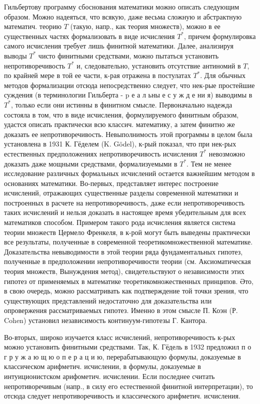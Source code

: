 \documentclass[10pt]{article}
\begin{document}
Гильбертову программу сбоснования математики можно описать следующим образом. Можно надеяться, что всякую, даже весьма сложную и абстрактную математич. теорию $T$ (такую, напр., как теория множеств), можно в ее существенных частях формализовать в виде исчисления $T^{*}$, причем формулировка самого исчисления требует лишь финитной математики. Далее, анализируя выводы $T^{*}$ чисто финитными средствами, можно пытаться установить непротиворечивость $T^{*}$ и, следовательно, установить отсутствие антиномий в $T$, по крайней мере в той ее части, к-рая отражена в постулатах $T^{*}$. Для обычных методов формализации отсюда непосредственно следует, что нек-рые простейшие суждения (в терминологии Гильберта - p е а л ьны е с у ж д е ни я) выводимы в $T^{*}$, только если они истинны в финитном смысле. Первоначально надежда состояла в том, что в виде исчисления, формулируемого финитным образом, удастся описать практически всю классич. математику, а затем финитно же доказать ее непротиворечивость. Невыполнимость этой программы в целом была установлена в 1931 К. Гёделем (K. Gödel), к-рый показал, что при нек-рых естественных предположениях непротиворечивость исчисления $T^{*}$ невозможно доказать даже мощными средствами, формализуемыми в $T^{*}$. Тем не менее исследование различных формальных исчислений остается важнейшим методом в основаниях математики. Во-первых, представляет интерес построение исчислений, отражающих существенные разделы современной математики и построенных в расчете на непротиворечивость, даже если непротиворечивость таких исчислений и нельзя доказать в настоящее время убедительным для всех математиков способом. Примером такого рода исчисления является система теории множеств Цермело Френкеля, в к-рой могут быть выведены практически все результаты, полученные в современной теоретикомножественной математике. Доказательства невыводимости в этой теории ряда фундаментальных гипотез, полученные в предположении непротиворечивости теории (см. Аксиоматическая теория множеств, Вынуждения метод), свидетельствуют о независимости этих гипотез от применяемых в математике теоретикомножественных принципов. Әто, в свою очередь, можно рассматривать как подтверждение той точки зрения, что существующих представлений недостаточно для доказательства или опровержения рассматриваемых гипотез. Именно в этом смысле П. Коэн (Р. Cohen) установил независимость континуум-гипотезы Г. Кантора.



Во-вторых, широко изучается класс исчислений, непротиворечивость к-рых можно установить финитными средствами. Так, К. Гёдель в 1932 предложил п о г р у ж а ю щ ю о п е р а ц и ю, перерабатывающую формулы, доказуемые в классическом арифметич. исчислении, в формулы, доказуемые в интуиционистском арифометич. исчислении. Если последнее считать непротиворечивым (напр., в силу его естественной финитной интерпретации), то отсюда следует непротиворечивость и классического арифметич. исчисления.
\end{document}
